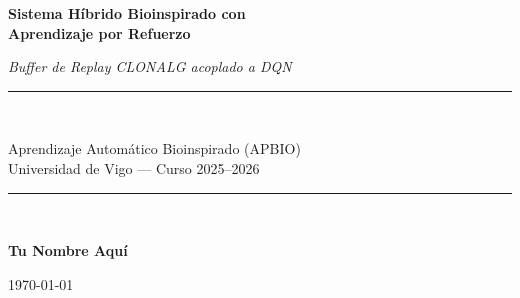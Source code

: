 \documentclass[12pt,a4paper]{article}
\begin{document}
 
\begin{titlepage}
  \centering
  \vspace*{2cm}
  {\LARGE\bfseries Sistema Híbrido Bioinspirado con\\[0.3em]
   Aprendizaje por Refuerzo\par}
  \vspace{0.5cm}
  {\large\itshape Buffer de Replay CLONALG acoplado a DQN\par}
  \vspace{1.5cm}
  \rule{\linewidth}{0.4pt}\\[0.5cm]
  {\large Aprendizaje Automático Bioinspirado (APBIO)\\[0.3em]
   Universidad de Vigo --- Curso 2025--2026\par}
  \vspace{1cm}
  \rule{\linewidth}{0.4pt}\\[1cm]
  {\large\bfseries Tu Nombre Aquí\par}
  \vspace{0.5cm}
  {\large \today\par}
  \vfill
  \begin{abstract}
    \noindent
    Este trabajo presenta un sistema híbrido que acopla el algoritmo de
    selección clonal CLONALG con un agente de aprendizaje por refuerzo
    profundo DQN para resolver el entorno \texttt{LunarLander-v3} de
    Gymnasium. CLONALG reemplaza el buffer de replay aleatorio estándar:
    las transiciones se almacenan como anticuerpos con afinidad proporcional
    al error temporal (TD-error), y el muestreo del mini-batch se guía por
    selección clonal con supresión clonal para garantizar diversidad. Los
    experimentos sobre 5 semillas independientes y 300 episodios revelan que
    el sistema CLONALG+DQN no supera al baseline DQN (retorno medio
    $-245.4 \pm 130.2$ frente a $208.7 \pm 22.1$), siendo la diferencia
    estadísticamente significativa ($t=7.76$, $p=0.001$). El análisis
    identifica como causa principal la ausencia de \textit{importance
    sampling weights} para corregir el sesgo introducido por el muestreo no
    uniforme. El proceso de desarrollo fue iterativo e implicó cuatro
    rediseños del buffer para resolver inestabilidad numérica, documentados
    en detalle en este informe como parte del proceso científico.
  \end{abstract}
\end{titlepage}
 
\tableofcontents
\newpage
 
\end{document}

